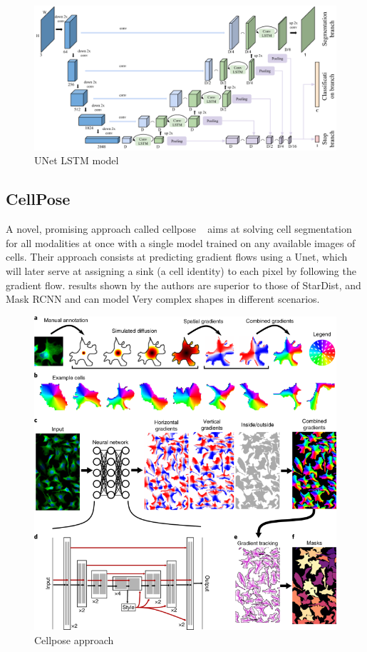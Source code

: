 \documentclass[main.tex]{subfiles}
\begin{document}
\begin{figure}[H]
    \centering
    \includegraphics[width=16cm]{images/unetlstm.png}
    \caption{UNet LSTM model}
    \label{fig:cnnlstm}
\end{figure}


\subsection{CellPose} A novel, promising approach called cellpose ~\cite{Stringer2020} aims at solving cell segmentation for all modalities at once with a single model trained on any available images of cells. Their approach consists at predicting gradient flows using a Unet, which will later serve at assigning a sink (a cell identity) to each pixel by following the gradient flow. results shown by the authors are superior to those of StarDist, and Mask RCNN and can model Very complex shapes in different scenarios.

\begin{figure}[H]
    \centering
    \includegraphics[width=14cm]{images/cellpose.png}
    \caption{Cellpose approach}
    \label{fig:ac}
\end{figure}
\end{document}

